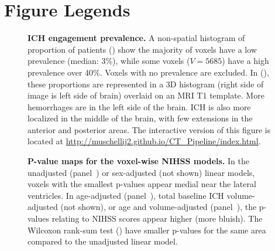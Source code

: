 \documentclass[10pt]{article}\usepackage[]{graphicx}\usepackage[]{color}
\begin{document}


\newpage

% 
% 
\printbibliography



\clearpage
\newpage
\thispagestyle{empty}
\pagestyle{plain}

\section{Figure Legends}




\begin{figure}[H]
\centering
  \subfloat{
  \label{prop:hist}
}
  \subfloat{
  \label{prop:img}
}

\caption{{\bf ICH engagement prevalence.} A non-spatial histogram of proportion of patients (\protect{}) show the majority of voxels have a low prevalence (median: 3\%), while some voxels ($V = 5685$) have a high prevalence over 40\%. Voxels with no prevalence are excluded.  In (\protect{}), these proportions are represented in a 3D histogram (right side of image is left side of brain) overlaid on an MRI T1 template.  More hemorrhages are in the left side of the brain.  ICH is also more localized in the middle of the brain, with few extensions in the anterior and posterior areas.   The interactive version of this figure is located at \url{http://muschellij2.github.io/CT_Pipeline/index.html}.}
  \label{fig:StrokeHist}
\end{figure}




\begin{figure}[H]
\centering
 \subfloat{
 \label{mods:m1}
 }
  \hfill
  \subfloat{
 \label{mods:m2}
 }
\newline
  \hfill
  \subfloat{
 \label{mods:m5}
 }
  \hfill
  \subfloat{
 \label{mods:m6}
 } 
  \caption{{\bf P-value maps for the voxel-wise NIHSS models.}  In the unadjusted (panel~\protect{}) or sex-adjusted (not shown) linear models, voxels with the smallest p-values appear medial near the lateral ventricles.  In age-adjusted (panel~\protect{}), total baseline ICH volume-adjusted (not shown), or age and volume-adjusted (panel~\protect{}), the p-values relating to NIHSS scores appear higher (more bluish).  The Wilcoxon rank-sum test (\protect{}) have smaller p-values for the same area compared to the unadjusted linear model. }
  \label{f:mods}
\end{figure}
\end{document}
